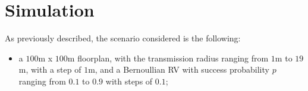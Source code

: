 %
\chapter{Simulation}\label{ch:simulation}
As previously described, the scenario considered is the following:
\begin{itemize}
    \item a $100$m x $100$m floorplan, with the transmission radius ranging
	from $1$m to $19$m, with a step of $1$m, and a Bernoullian RV with success
	probability $p$ ranging from $0.1$ to $0.9$ with steps of $0.1$;
\end{itemize}
